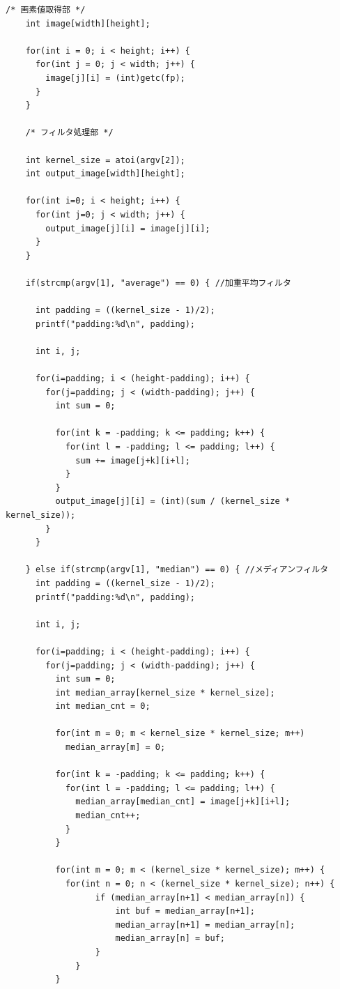 \documentclass{jsarticle}
\begin{document}
\begin{lstlisting}[caption=filter.c,label=ほげ]
    /* 画素値取得部 */
    int image[width][height];

    for(int i = 0; i < height; i++) {
      for(int j = 0; j < width; j++) {
        image[j][i] = (int)getc(fp);
      }
    }

    /* フィルタ処理部 */

    int kernel_size = atoi(argv[2]);
    int output_image[width][height];

    for(int i=0; i < height; i++) {
      for(int j=0; j < width; j++) {
        output_image[j][i] = image[j][i];
      }
    }

    if(strcmp(argv[1], "average") == 0) { //加重平均フィルタ

      int padding = ((kernel_size - 1)/2);
      printf("padding:%d\n", padding);

      int i, j;

      for(i=padding; i < (height-padding); i++) {
        for(j=padding; j < (width-padding); j++) {
          int sum = 0;

          for(int k = -padding; k <= padding; k++) {
            for(int l = -padding; l <= padding; l++) {
              sum += image[j+k][i+l];
            }
          }
          output_image[j][i] = (int)(sum / (kernel_size * kernel_size));
        }
      }

    } else if(strcmp(argv[1], "median") == 0) { //メディアンフィルタ
      int padding = ((kernel_size - 1)/2);
      printf("padding:%d\n", padding);

      int i, j;

      for(i=padding; i < (height-padding); i++) {
        for(j=padding; j < (width-padding); j++) {
          int sum = 0;
          int median_array[kernel_size * kernel_size];
          int median_cnt = 0;

          for(int m = 0; m < kernel_size * kernel_size; m++)
            median_array[m] = 0;

          for(int k = -padding; k <= padding; k++) {
            for(int l = -padding; l <= padding; l++) {
              median_array[median_cnt] = image[j+k][i+l];
              median_cnt++;
            }
          }

          for(int m = 0; m < (kernel_size * kernel_size); m++) {
            for(int n = 0; n < (kernel_size * kernel_size); n++) {
                  if (median_array[n+1] < median_array[n]) {
                      int buf = median_array[n+1];
                      median_array[n+1] = median_array[n];
                      median_array[n] = buf;
                  }
              }
          }


\end{lstlisting}
\end{document}
